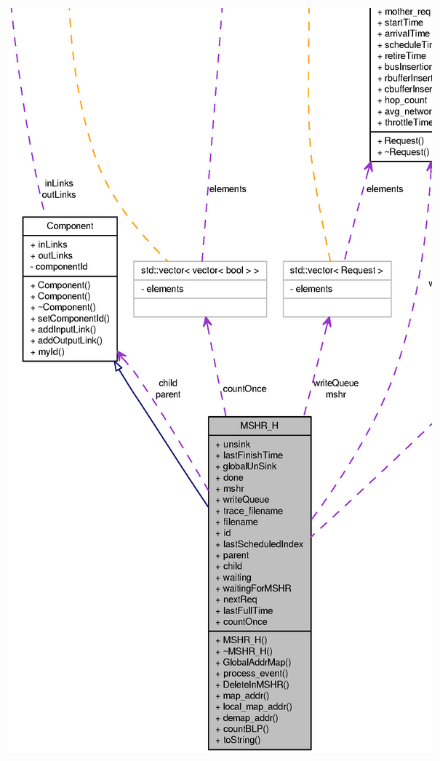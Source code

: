 \begin{figure}[H]
\begin{center}
\leavevmode
\includegraphics[width=400pt]{classMSHR__H__coll__graph}
\end{center}
\end{figure}
